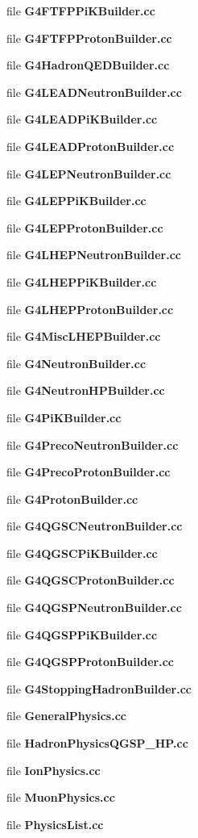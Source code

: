 \begin{CompactItemize}
\item 
file {\bf G4FTFPPiKBuilder.cc}
\item 
file {\bf G4FTFPProtonBuilder.cc}
\item 
file {\bf G4HadronQEDBuilder.cc}
\item 
file {\bf G4LEADNeutronBuilder.cc}
\item 
file {\bf G4LEADPiKBuilder.cc}
\item 
file {\bf G4LEADProtonBuilder.cc}
\item 
file {\bf G4LEPNeutronBuilder.cc}
\item 
file {\bf G4LEPPiKBuilder.cc}
\item 
file {\bf G4LEPProtonBuilder.cc}
\item 
file {\bf G4LHEPNeutronBuilder.cc}
\item 
file {\bf G4LHEPPiKBuilder.cc}
\item 
file {\bf G4LHEPProtonBuilder.cc}
\item 
file {\bf G4MiscLHEPBuilder.cc}
\item 
file {\bf G4NeutronBuilder.cc}
\item 
file {\bf G4NeutronHPBuilder.cc}
\item 
file {\bf G4PiKBuilder.cc}
\item 
file {\bf G4PrecoNeutronBuilder.cc}
\item 
file {\bf G4PrecoProtonBuilder.cc}
\item 
file {\bf G4ProtonBuilder.cc}
\item 
file {\bf G4QGSCNeutronBuilder.cc}
\item 
file {\bf G4QGSCPiKBuilder.cc}
\item 
file {\bf G4QGSCProtonBuilder.cc}
\item 
file {\bf G4QGSPNeutronBuilder.cc}
\item 
file {\bf G4QGSPPiKBuilder.cc}
\item 
file {\bf G4QGSPProtonBuilder.cc}
\item 
file {\bf G4StoppingHadronBuilder.cc}
\item 
file {\bf GeneralPhysics.cc}
\item 
file {\bf HadronPhysicsQGSP_HP.cc}
\item 
file {\bf IonPhysics.cc}
\item 
file {\bf MuonPhysics.cc}
\item 
file {\bf PhysicsList.cc}
\end{CompactItemize}
